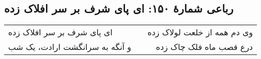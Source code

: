 \begin{center}
\section*{رباعی شمارهٔ ۱۵۰: ای پای شرف بر سر افلاک زده}
\label{sec:150}
\begin{longtable}{l p{0.5cm} r}
ای پای شرف بر سر افلاک زده
&&
وی دم همه از خلعت لولاک زده
\\
و آنگه به سرانگشت ارادت، یک شب
&&
درع قصب ماه فلک چاک زده
\\
\end{longtable}
\end{center}
